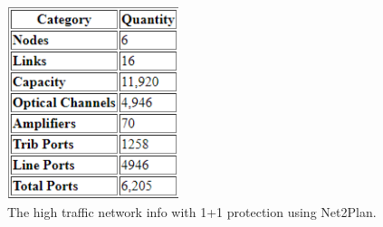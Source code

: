 \begin{figure}[h!]
\centering
\includegraphics[width=5cm]{sdf/heuristic/figures/High_Network_Info_Protec_Opaque}
\caption{The high traffic network info with 1+1 protection using Net2Plan.}
\label{High_Network_Info_Protec_Opaque}
\end{figure}
